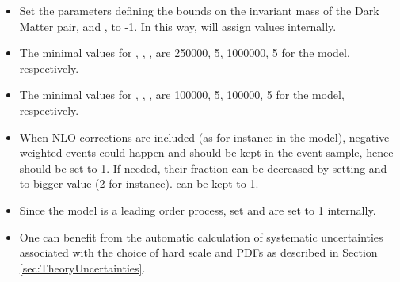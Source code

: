 \begin{itemize}
\item Set the parameters defining the bounds on the invariant mass of the Dark Matter pair, \masslow and \masshigh, to -1. In this way, \powheg will assign values internally. 
\item The minimal values for \ncallOne, \itmxOne, \ncallTwo, \itmxTwo are 250000, 5, 1000000, 5 for the \modelDMV model, respectively.
\item The minimal values for \ncallOne, \itmxOne, \ncallTwo, \itmxTwo are 100000, 5, 100000, 5 for the \modelDMStloop model, respectively.
\item When NLO corrections are included (as for instance in the
  \modelDMV model), negative-weighted events could happen and should
  be kept in the event sample, hence \withnegweights should be set to
  1. If needed, their fraction can be decreased by setting \foldsci
  and \foldy to bigger value (2 for instance). \foldphi can be kept to
  1.
\item Since the \modelDMStloop model is a leading order process, set \LOevents and \bornonly are set to 1 internally.
\item One can benefit from the automatic calculation of systematic uncertainties associated with the choice of hard scale and PDFs as described in Section\,\ref{sec:TheoryUncertainties}.

\end{itemize}




